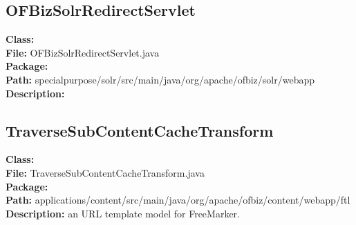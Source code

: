 
\subsection{OFBizSolrRedirectServlet}
	\textbf{Class:}  \\ 
	\textbf{File:} OFBizSolrRedirectServlet.java \\ 
	\textbf{Package:}  \\ 
	\textbf{Path:} specialpurpose/solr/src/main/java/org/apache/ofbiz/solr/webapp \\
	\textbf{Description:}
	
	
\subsection{TraverseSubContentCacheTransform}
\textbf{Class:}  \\ 
\textbf{File:} TraverseSubContentCacheTransform.java \\ 
\textbf{Package:}  \\ 
\textbf{Path:} applications/content/src/main/java/org/apache/ofbiz/content/webapp/ftl
\textbf{Description:} an URL template model for FreeMarker.
